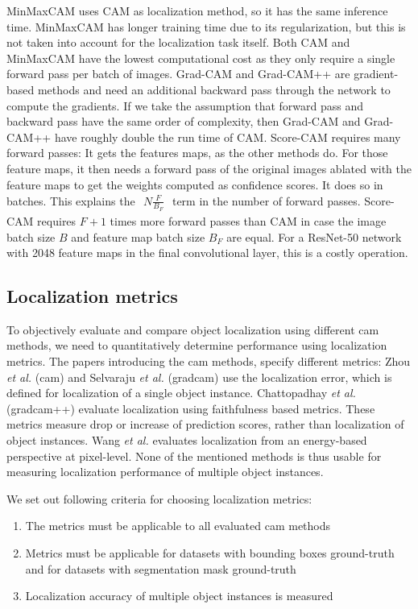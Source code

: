 MinMaxCAM uses CAM as localization method, so it has the same inference time. MinMaxCAM has longer training time due to its regularization, but this is not taken into account for the localization task itself. Both CAM and MinMaxCAM have the lowest computational cost as they only require a single forward pass per batch of images. Grad-CAM and Grad-CAM++ are gradient-based methods and need an additional backward pass through the network to compute the gradients. If we take the assumption that forward pass and backward pass have the same order of complexity, then Grad-CAM and Grad-CAM++ have roughly double the run time of CAM. Score-CAM requires many forward passes: It gets the features maps, as the other methods do. For those feature maps, it then needs a forward pass of the original images ablated with the feature maps to get the weights computed as confidence scores. It does so in batches. This explains the $\begin{aligned}N\frac{F}{B_F}\end{aligned}$ term in the number of forward passes. Score-CAM requires $F + 1$ times more forward passes than CAM in case the image batch size $B$ and feature map batch size $B_F$ are equal. For a ResNet-50 network with 2048 feature maps in the final convolutional layer, this is a costly operation.

\subsection{Localization metrics} \label{sec:localization_metrics}
To objectively evaluate and compare object localization using different \acrshort{cam} methods, we need to quantitatively determine performance using localization metrics. The papers introducing the \acrshort{cam} methods, specify different metrics: Zhou \textit{et al.} \cite{zhou2016cvpr} (\acrshort{cam}) and Selvaraju \textit{et al.} \cite{selvaraju2017grad} (\acrshort{gradcam}) use the localization error, which is defined for localization of a single object instance. Chattopadhay \textit{et al.} \cite{chattopadhay2018grad} (\acrshort{gradcam}++) evaluate localization using faithfulness based metrics. These metrics measure drop or increase of prediction scores, rather than localization of object instances. Wang \textit{et al.} \cite{wang2020score} evaluates localization from an energy-based perspective at pixel-level. None of the mentioned methods is thus usable for measuring localization performance of multiple object instances.

We set out following criteria for choosing localization metrics:
\begin{enumerate}
    \item The metrics must be applicable to all evaluated \acrshort{cam} methods
    \item Metrics must be applicable for datasets with bounding boxes ground-truth and for datasets with segmentation mask ground-truth
    \item Localization accuracy of multiple object instances is measured
\end{enumerate}

